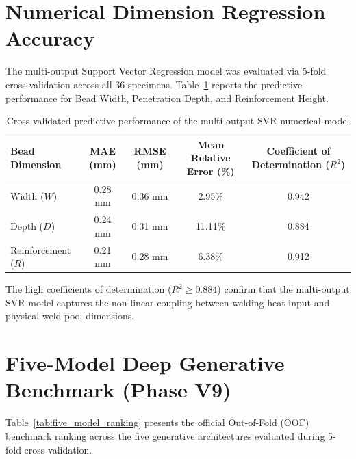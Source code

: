 \documentclass[12pt,a4paper,oneside]{report}
\begin{document}
\section{Numerical Dimension Regression Accuracy}
The multi-output Support Vector Regression model was evaluated via 5-fold cross-validation across all 36 specimens. Table~\ref{tab:svr_accuracy} reports the predictive performance for Bead Width, Penetration Depth, and Reinforcement Height.

\begin{table}[htbp]\centering
\caption{Cross-validated predictive performance of the multi-output SVR numerical model}\label{tab:svr_accuracy}
\small
\begin{tabular}{@{}lcccc@{}}
\toprule
\textbf{Bead Dimension} & \textbf{MAE (mm)} & \textbf{RMSE (mm)} & \textbf{Mean Relative Error (\%)} & \textbf{Coefficient of Determination ($R^2$)}\\ \midrule
Width ($W$)          & 0.28 mm & 0.36 mm & 2.95\% & 0.942\\
Depth ($D$)          & 0.24 mm & 0.31 mm & 11.11\%& 0.884\\
Reinforcement ($R$)  & 0.21 mm & 0.28 mm & 6.38\% & 0.912\\
\bottomrule
\end{tabular}
\end{table}

The high coefficients of determination ($R^2 \ge 0.884$) confirm that the multi-output SVR model captures the non-linear coupling between welding heat input and physical weld pool dimensions.

\section{Five-Model Deep Generative Benchmark (Phase V9)}
Table~\ref{tab:five_model_ranking} presents the official Out-of-Fold (OOF) benchmark ranking across the five generative architectures evaluated during 5-fold cross-validation.
\end{document}
